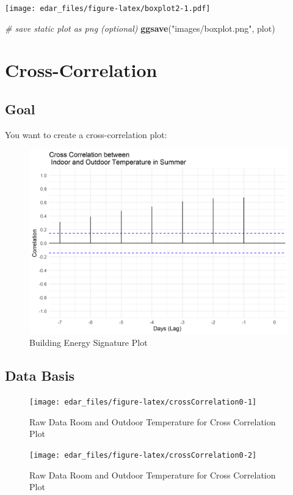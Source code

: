\documentclass[
  a4paperpaper,
]{book}
\newenvironment{Shaded}{\begin{snugshade}}{\end{snugshade}}
\newcommand{\CommentTok}[1]{\textcolor[rgb]{0.56,0.35,0.01}{\textit{#1}}}
\newcommand{\KeywordTok}[1]{\textcolor[rgb]{0.13,0.29,0.53}{\textbf{#1}}}
\newcommand{\NormalTok}[1]{#1}
\newcommand{\StringTok}[1]{\textcolor[rgb]{0.31,0.60,0.02}{#1}}
\let\oldShaded\Shaded
\let\endoldShaded\endShaded
\renewenvironment{Shaded}{\footnotesize\oldShaded}{\endoldShaded}
\begin{document}
\texttt{[image: edar\_files/figure-latex/boxplot2-1.pdf]}

\begin{Shaded}
\begin{Highlighting}[]
\CommentTok{# save static plot as png (optional)}
\KeywordTok{ggsave}\NormalTok{(}\StringTok{"images/boxplot.png"}\NormalTok{, plot)}
\end{Highlighting}
\end{Shaded}

\newpage

\hypertarget{cross-correlation}{%
\section{Cross-Correlation}\label{cross-correlation}}

\hypertarget{goal-1}{%
\subsection{Goal}\label{goal-1}}

You want to create a cross-correlation plot:

\begin{figure}
\includegraphics[width=0.7\linewidth]{images/crossCorrelation} \caption{Building Energy Signature Plot}\label{fig:unnamed-chunk-11}
\end{figure}

\hypertarget{data-basis-1}{%
\subsection{Data Basis}\label{data-basis-1}}

\begin{figure}
\texttt{[image: edar\_files/figure-latex/crossCorrelation0-1]} \caption{Raw Data Room and Outdoor Temperature for Cross Correlation Plot}\label{fig:crossCorrelation0-1}
\end{figure}
\begin{figure}
\texttt{[image: edar\_files/figure-latex/crossCorrelation0-2]} \caption{Raw Data Room and Outdoor Temperature for Cross Correlation Plot}\label{fig:crossCorrelation0-2}
\end{figure}
\end{document}
